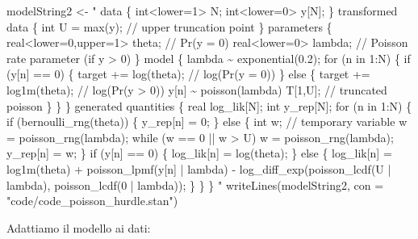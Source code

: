 \documentclass[
]{memoir}
\newenvironment{Shaded}{\begin{snugshade}}{\end{snugshade}}
\newcommand{\AttributeTok}[1]{\textcolor[rgb]{0.77,0.63,0.00}{#1}}
\newcommand{\FunctionTok}[1]{\textcolor[rgb]{0.00,0.00,0.00}{#1}}
\newcommand{\NormalTok}[1]{#1}
\newcommand{\OtherTok}[1]{\textcolor[rgb]{0.56,0.35,0.01}{#1}}
\newcommand{\StringTok}[1]{\textcolor[rgb]{0.31,0.60,0.02}{#1}}
\theoremstyle{definition}
\theoremstyle{definition}
\theoremstyle{definition}
\theoremstyle{definition}
\theoremstyle{remark}
\begin{document}
\begin{Shaded}
\begin{Highlighting}[]
\NormalTok{modelString2 }\OtherTok{\textless{}{-}} \StringTok{"}
\StringTok{data \{}
\StringTok{  int\textless{}lower=1\textgreater{} N;}
\StringTok{  int\textless{}lower=0\textgreater{} y[N];}
\StringTok{\}}
\StringTok{transformed data \{}
\StringTok{  int U = max(y);  // upper truncation point}
\StringTok{\}}
\StringTok{parameters \{}
\StringTok{  real\textless{}lower=0,upper=1\textgreater{} theta; // Pr(y = 0)}
\StringTok{  real\textless{}lower=0\textgreater{} lambda; // Poisson rate parameter (if y \textgreater{} 0)}
\StringTok{\}}
\StringTok{model \{}
\StringTok{  lambda \textasciitilde{} exponential(0.2);}
\StringTok{  }
\StringTok{  for (n in 1:N) \{}
\StringTok{    if (y[n] == 0) \{}
\StringTok{      target += log(theta);  // log(Pr(y = 0))}
\StringTok{    \} else \{}
\StringTok{      target += log1m(theta);  // log(Pr(y \textgreater{} 0))}
\StringTok{      y[n] \textasciitilde{} poisson(lambda) T[1,U];  // truncated poisson}
\StringTok{    \}}
\StringTok{  \}}
\StringTok{\}}
\StringTok{generated quantities \{}
\StringTok{  real log\_lik[N];}
\StringTok{  int y\_rep[N];}
\StringTok{  for (n in 1:N) \{}
\StringTok{    if (bernoulli\_rng(theta)) \{}
\StringTok{      y\_rep[n] = 0;}
\StringTok{    \} else \{}
\StringTok{      int w;  // temporary variable}
\StringTok{      w = poisson\_rng(lambda); }
\StringTok{      while (w == 0 || w \textgreater{} U)}
\StringTok{        w = poisson\_rng(lambda);}
\StringTok{        }
\StringTok{      y\_rep[n] = w;}
\StringTok{    \}}
\StringTok{    if (y[n] == 0) \{}
\StringTok{      log\_lik[n] = log(theta);}
\StringTok{    \} else \{}
\StringTok{      log\_lik[n] = log1m(theta)}
\StringTok{    + poisson\_lpmf(y[n] | lambda)}
\StringTok{    {-} log\_diff\_exp(poisson\_lcdf(U | lambda),}
\StringTok{                       poisson\_lcdf(0 | lambda));}
\StringTok{    \}}
\StringTok{  \}}
\StringTok{\}}
\StringTok{"}
\FunctionTok{writeLines}\NormalTok{(modelString2, }\AttributeTok{con =} \StringTok{"code/code\_poisson\_hurdle.stan"}\NormalTok{)}
\end{Highlighting}
\end{Shaded}

\noindent
Adattiamo il modello ai dati:
\end{document}
